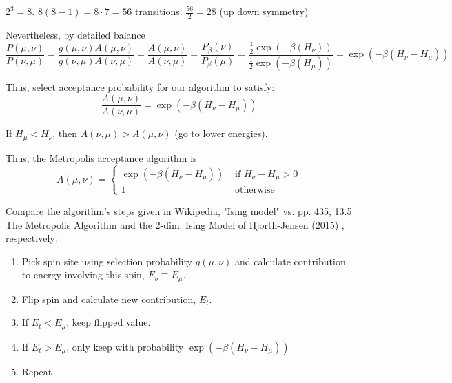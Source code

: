 \documentclass[10pt]{amsart}
\begin{document}
\begin{multicols*}{2}
$2^3=8$.  $8(8-1) = 8 \cdot 7 = 56$ transitions.  $\frac{56}{2} = 28$ (up down symmetry)

Nevertheless, by detailed balance 
\[
\frac{P(\mu,\nu)}{ P(\nu,\mu)} = \frac{g(\mu,\nu) A(\mu,\nu) }{ g(\nu,\mu) A(\nu,\mu)} = \frac{ A(\mu,\nu) }{ A(\nu, \mu)} = \frac{P_{\beta}(\nu) }{ P_{\beta}(\mu)} = \frac{ \frac{1}{2} \exp{ (-\beta(H_{\nu}))} }{ \frac{1}{2} \exp{ (-\beta(H_{\mu}))}  } = \exp{ (-\beta(H_{\nu} - H_{\mu}))} 
\] 

Thus, select acceptance probability for our algorithm to satisfy:
\begin{equation}
\frac{ A(\mu,\nu) }{ A(\nu,\mu) } = \exp{ (-\beta(H_{\nu} - H_{\mu}))}  
\end{equation}

If $H_{\mu} < H_{\nu}$, then $A(\nu,\mu) > A(\mu,\nu)$ (go to lower energies).    

Thus, the Metropolis acceptance algorithm is 
\begin{equation}
A(\mu,\nu)  = \begin{cases} \exp{ (-\beta( H_{\nu} - H_{\mu} ))} & \text{ if } H_{\nu} - H_{\mu} > 0 \\ 
1 & \text{ otherwise } \end{cases}
\end{equation}

Compare the algorithm's steps given in \href{https://en.wikipedia.org/wiki/Ising_model}{Wikipedia, "Ising model"} vs. pp. 435, 13.5 The Metropolis Algorithm and the 2-dim. Ising Model of Hjorth-Jensen (2015) \cite{Hjor2015}, respectively: 

\begin{enumerate}
	\item Pick spin site using selection probability $g(\mu,\nu)$ and calculate contribution to energy involving this spin, $E_b\equiv E_{\mu}$.  
	\item Flip spin and calculate new contribution, $E_t$.  
	\item If $E_t < E_{\mu}$, keep flipped value.  
	\item If $E_t > E_{\mu}$, only keep with probability $\exp{(-\beta (H_{\nu} - H_{\mu}))}$
	\item Repeat
\end{enumerate}


\end{multicols*}
\end{document}
